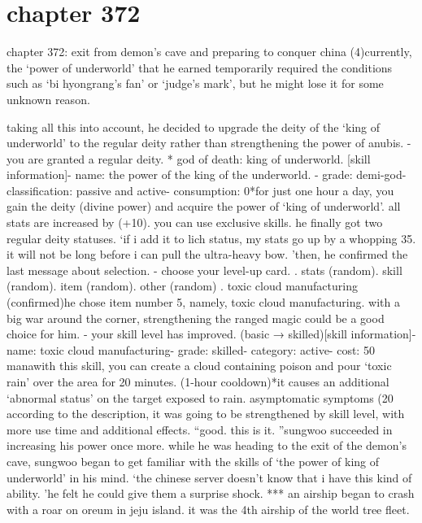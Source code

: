 \section{chapter 372}

chapter 372: exit from demon’s cave and preparing to conquer china (4)currently, the ‘power of underworld’ that he earned temporarily required the conditions such as ‘bi hyongrang’s fan’ or ‘judge’s mark’, but he might lose it for some unknown reason.





taking all this into account, he decided to upgrade the deity of the ‘king of underworld’ to the regular deity rather than strengthening the power of anubis.
- you are granted a regular deity.
* god of death: king of underworld.
[skill information]- name: the power of the king of the underworld.
- grade: demi-god- classification: passive and active- consumption: 0*for just one hour a day, you gain the deity (divine power) and acquire the power of ‘king of underworld’.
 all stats are increased by (+10).
 you can use exclusive skills.
he finally got two regular deity statuses.
‘if i add it to lich status, my stats go up by a whopping 35.
 it will not be long before i can pull the ultra-heavy bow.
’then, he confirmed the last message about selection.
- choose your level-up card.
.
 stats (random).
 skill (random).
 item (random).
 other (random)
.
 toxic cloud manufacturing (confirmed)he chose item number 5, namely, toxic cloud manufacturing.
 with a big war around the corner, strengthening the ranged magic could be a good choice for him.
- your skill level has improved.
 (basic → skilled)[skill information]- name: toxic cloud manufacturing- grade: skilled- category: active- cost: 50 manawith this skill, you can create a cloud containing poison and pour ‘toxic rain’ over the area for 20 minutes.
 (1-hour cooldown)*it causes an additional ‘abnormal status’ on the target exposed to rain.
 asymptomatic symptoms (20%
according to the description, it was going to be strengthened by skill level, with more use time and additional effects.
“good.
 this is it.
”sungwoo succeeded in increasing his power once more.
while he was heading to the exit of the demon’s cave, sungwoo began to get familiar with the skills of ‘the power of king of underworld’ in his mind.
‘the chinese server doesn’t know that i have this kind of ability.
’he felt he could give them a surprise shock.
***
an airship began to crash with a roar on oreum in jeju island.
 it was the 4th airship of the world tree fleet.
